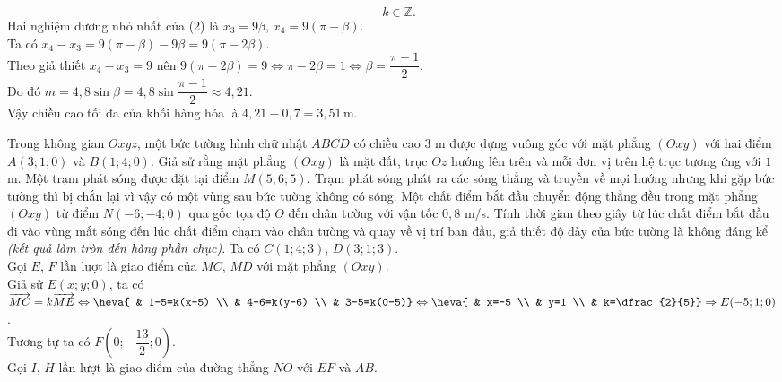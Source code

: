 \begin{ex}
{\[		\quad k \in \mathbb{Z}.\]
		Hai nghiệm dương nhỏ nhất của (2) là  $ x_3 = 9\beta$, $x_4 = 9(\pi - \beta)$.\\	
		Ta có $ x_4 - x_3 = 9(\pi - \beta) - 9\beta = 9(\pi - 2\beta)$.\\		
		Theo giả thiết $ x_4 - x_3 = 9 $ nên   $ 9(\pi - 2\beta) = 9 \Leftrightarrow \pi - 2\beta = 1 \Leftrightarrow \beta = \dfrac{\pi - 1}{2}$.\\
		Do đó  		
		$ m = 4{,}8\sin\beta = 4{,}8\sin\dfrac{\pi - 1}{2} \approx 4{,}21$.\\		
		Vậy chiều cao tối đa của khối hàng hóa là  
		$ 4{,}21 - 0{,}7 = 3{,}51\,\text{m}$.		 
	}
\end{ex}

\begin{ex}%
	Trong không gian $Oxyz$, một bức tường hình chữ nhật $ABCD$ có chiều cao $3$ m được dựng vuông góc với mặt phẳng $(Oxy)$ với hai điểm $A(3;1;0)$ và $B(1;4;0)$. Giả sử rằng mặt phẳng $(Oxy)$ là mặt đất, trục $Oz$ hướng lên trên và mỗi đơn vị trên hệ trục tương ứng với $1$ m. Một trạm phát sóng được đặt tại điểm $M(5;6;5)$. Trạm phát sóng phát ra các sóng thẳng và truyền về mọi hướng nhưng khi gặp bức tường thì bị chắn lại vì vậy có một vùng sau bức tường không có sóng. Một chất điểm bắt đầu chuyển động thẳng đều trong mặt phẳng $(Oxy)$ từ điểm $N(-6;-4;0)$ qua gốc tọa độ $O$ đến chân tường với vận tốc $0{,}8$ m/s. Tính thời gian theo giây từ lúc chất điểm bắt đầu đi vào vùng mất sóng đến lúc chất điểm chạm vào chân tường và quay về vị trí ban đầu, giả thiết độ dày của bức tường là không đáng kể \textit{(kết quả làm tròn đến hàng phần chục)}.
	\loigiai
	{
		Ta có $C(1;4;3)$, $D(3;1;3)$. \\
		Gọi $E$, $F$ lần lượt là giao điểm của $MC$, $MD$ với mặt phẳng $(Oxy)$.\\
		Giả sử $E(x;y;0)$, ta có $\overrightarrow{MC}=k \overrightarrow{ME} \Leftrightarrow \heva{ & 1-5=k(x-5) \\ & 4-6=k(y-6) \\ & 3-5=k(0-5)} \Leftrightarrow \heva{ & x=-5 \\ & y=1 \\ & k=\dfrac{2}{5}} \Rightarrow E(-5;1;0)$. \\
		Tương tự ta có $F\left(0; -\dfrac{13}{2}; 0\right)$. \\
		Gọi $I$, $H$ lần lượt là giao điểm của đường thẳng $NO$ với $EF$ và $AB$. \\
}
\end{ex}
